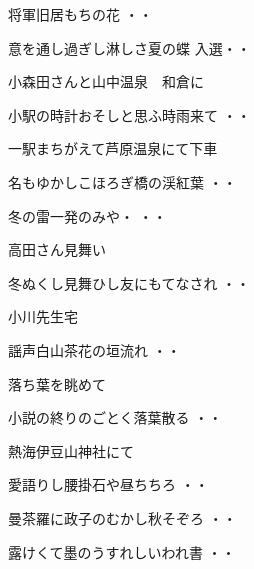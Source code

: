 \begin{shiika}将軍旧居もちの花
\hfill{・・}\end{shiika}
\begin{shiika}意を通し過ぎし淋しさ夏の蝶
\hfill{入選・・}\end{shiika}
\vspace{0.6cm}
小森田さんと山中温泉　和倉に
\begin{shiika}小駅の時計おそしと思ふ時雨来て
\hfill{・・}\end{shiika}
\vspace{0.6cm}
一駅まちがえて芦原温泉にて下車
\begin{shiika}名もゆかしこほろぎ橋の渓紅葉
\hfill{・・}\end{shiika}
\vspace{0.6cm}
\begin{shiika}冬の雷一発のみや・
\hfill{・・}\end{shiika}
\vspace{0.6cm}
高田さん見舞い
\begin{shiika}冬ぬくし見舞ひし友にもてなされ
\hfill{・・}\end{shiika}
\vspace{0.6cm}小川先生宅
\begin{shiika}謡声白山茶花の垣流れ
\hfill{・・}\end{shiika}
\vspace{0.6cm}
落ち葉を眺めて
\begin{shiika}小説の終りのごとく落葉散る
\hfill{・・}\end{shiika}
\vspace{0.6cm}
熱海伊豆山神社にて
\begin{shiika}愛語りし腰掛石や昼ちちろ
\hfill{・・}\end{shiika}
\vspace{0.6cm}
\begin{shiika}曼茶羅に政子のむかし秋そぞろ
\hfill{・・}\end{shiika}
\vspace{0.6cm}
\begin{shiika}露けくて墨のうすれしいわれ書
\hfill{・・}\end{shiika}
